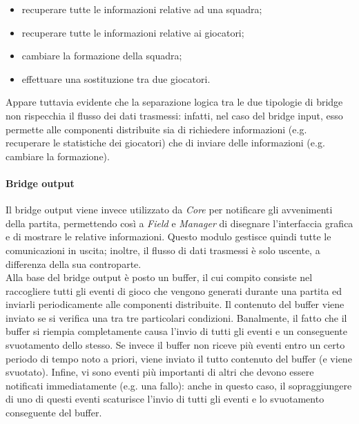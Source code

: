 \begin{itemize}
	\item recuperare tutte le informazioni relative ad una squadra;
	\item recuperare tutte le informazioni relative ai giocatori;
	\item cambiare la formazione della squadra;
	\item effettuare una sostituzione tra due giocatori.
\end{itemize}

Appare tuttavia evidente che la separazione logica tra le due tipologie di bridge non rispecchia il flusso dei dati trasmessi: infatti, nel caso del bridge input, esso permette alle componenti distribuite sia di richiedere informazioni (e.g. recuperare le statistiche dei giocatori) che di inviare delle informazioni (e.g. cambiare la formazione).\\

\paragraph{Bridge output}\label{sec:analisi_distribuzione_bridge_output} Il bridge output viene invece utilizzato da \textit{Core} per notificare gli avvenimenti della partita, permettendo così a \textit{Field} e \textit{Manager} di disegnare l'interfaccia grafica e di mostrare le relative informazioni. Questo modulo gestisce quindi tutte le comunicazioni in uscita; inoltre, il flusso di dati trasmessi è solo uscente, a differenza della sua controparte.\\

Alla base del bridge output è posto un buffer, il cui compito consiste nel raccogliere tutti gli eventi di gioco che vengono generati durante una partita ed inviarli periodicamente alle componenti distribuite. Il contenuto del buffer viene inviato se si verifica una tra tre particolari condizioni. Banalmente, il fatto che il buffer si riempia completamente causa l'invio di tutti gli eventi e un conseguente svuotamento dello stesso. Se invece il buffer non riceve più eventi entro un certo periodo di tempo noto a priori, viene inviato il tutto contenuto del buffer (e viene svuotato). Infine, vi sono eventi più importanti di altri che devono essere notificati immediatamente (e.g. una fallo): anche in questo caso, il sopraggiungere di uno di questi eventi scaturisce l'invio di tutti gli eventi e lo svuotamento conseguente del buffer.\\

